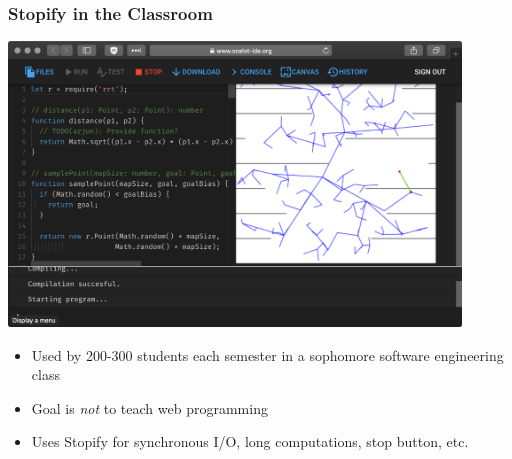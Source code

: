\documentclass[8pt,pdf,handout]{beamer}
\begin{document}
\begin{frame}
\frametitle{Stopify in the Classroom}

\begin{center}
\includegraphics[width=0.9\textwidth]{ocelot_screenshot.pdf}
\end{center}

\begin{itemize}

    \item Used by 200-300 students each semester in a sophomore software engineering class

    \item Goal is \emph{not} to teach web programming

    \item Uses Stopify for synchronous I/O, long computations, stop button, etc.

\end{itemize}

\end{frame}
\end{document}
